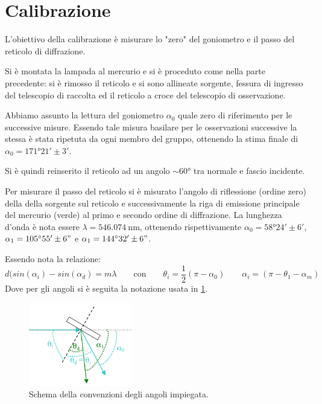 \section{Calibrazione}
	L'obiettivo della calibrazione è misurare lo "zero" del goniometro e il passo del reticolo di diffrazione.
	
	Si è montata la lampada al mercurio e si è proceduto come nella parte precedente:
	si è rimosso il reticolo e si sono allineate sorgente, fessura di ingresso del telescopio di raccolta
	ed il reticolo a croce del telescopio di osservazione.
	
	Abbiamo assunto la lettura del goniometro
	$\alpha_0$ quale zero di riferimento per le successive misure.
	Essendo tale misura basilare per le osservazioni successive la stessa è stata ripetuta da ogni membro del gruppo,
	ottenendo la stima finale di $\alpha_0 = \ang{171;21; } \pm 3' $.
	
	Si è quindi reinserito il reticolo ad un angolo $\sim \ang{60}$
	tra normale e fascio incidente.

	Per misurare il passo del reticolo si è misurato l'angolo di riflessione (ordine zero) della della sorgente sul reticolo e successivamente la riga di emissione principale del mercurio (verde) al 
	primo e secondo ordine di diffrazione. La lunghezza d'onda è nota essere $\lambda = \SI{546.074}{\nano\meter}$,
	ottenendo rispettivamente $\alpha_0=\ang{58;24;} \pm 6'$, $\alpha_1=\ang{105;55}\pm 6"$ e $\alpha_1=\ang{144;32}\pm 6"$.
	
	Essendo nota la relazione:
	\smallskip
	\begin{equation*}
	d(sin (\alpha_i) - sin (\alpha_d) = m \lambda\qquad \text{con}\qquad \theta_i=\frac{1}{2}(\pi- \alpha_0)\qquad \alpha_i=(\pi- \theta_1-\alpha_m)
	\end{equation*}
	Dove per gli angoli si è seguita la notazione usata in \figurename{ \ref{fig:angoli}}.
	\bigskip
	\begin{figure} [H]
		\centering
		\includegraphics[width=0.4\textwidth]{../FIgs-tabs/angoli.png}
		\caption{Schema della convenzioni degli angoli impiegata.}
		\label{fig:angoli}
	\end{figure}
	\smallskip

